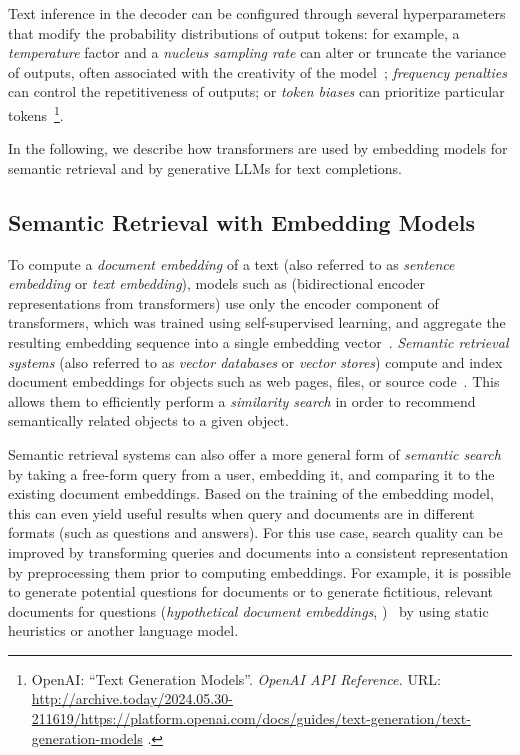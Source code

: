 \begin{description}[noextralabelsep]
	Text inference in the decoder can be configured through several hyperparameters that modify the probability distributions of output tokens:
	for example, a \emph{temperature} factor and a \emph{nucleus sampling rate} can alter or truncate the variance of outputs, often associated with the creativity of the model~\cite{holtzman2020curious}; \emph{frequency penalties} can control the repetitiveness of outputs; or \emph{token biases} can prioritize particular tokens~\footnote{
		OpenAI: ``Text Generation Models''. \emph{OpenAI API Reference.} URL:
		\url{http://archive.today/2024.05.30-211619/https://platform.openai.com/docs/guides/text-generation/text-generation-models}%
		.
	}.
\end{description}

In the following, we describe how transformers are used by embedding models for semantic retrieval and by generative LLMs for text completions.

\subsection*{Semantic Retrieval with Embedding Models}
\label{sec:background/semtec/retrieval}

To compute a \emph{document embedding} of a text (also referred to as \emph{sentence embedding} or \emph{text embedding}), models such as  (bidirectional encoder representations from transformers) %
use only the encoder component of transformers, which was trained using self-supervised learning, and aggregate the resulting embedding sequence into a single embedding vector~\cite{devlin2019bert,raffel2023exploring}.
\emph{Semantic retrieval systems} (also referred to as \emph{vector databases} or \emph{vector stores}) compute and index document embeddings for objects such as web pages, files, or source code~\cite{husain2020codesearchnet,lewis2020retrieval}.
This allows them to efficiently perform a \emph{similarity search} in order to recommend semantically related objects to a given object.

Semantic retrieval systems can also offer a more general form of \emph{semantic search} by taking a free-form query from a user, embedding it, and comparing it to the existing document embeddings.
Based on the training of the embedding model, this can even yield useful results when query and documents are in different formats (such as questions and answers).
For this use case, search quality can be improved by transforming queries and documents into a consistent representation by preprocessing them prior to computing embeddings.
For example, it is possible to generate potential questions for documents or to generate fictitious, relevant documents for questions (\emph{hypothetical document embeddings}, )~\cite{mao2021generation,gao2022precise} by using static heuristics or another language model.

